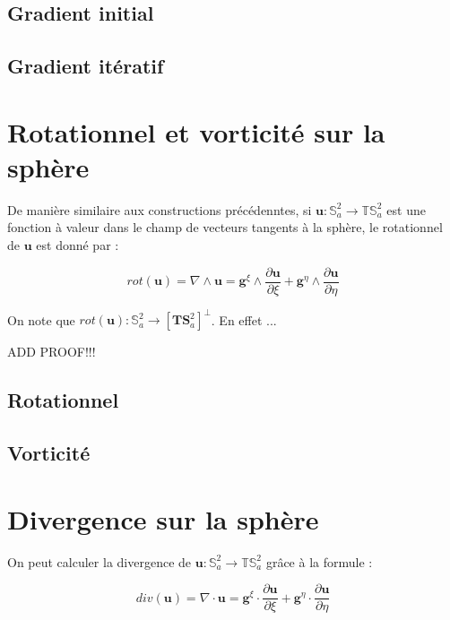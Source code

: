 \subsection{Gradient initial}

\subsection{Gradient itératif}

\section{Rotationnel et vorticité sur la sphère}

De manière similaire aux constructions précédenntes, si $\mathbf{u} : \mathbb{S}^2_a \rightarrow \mathbb{T} \mathbb{S}^2_a$ est une fonction à valeur dans le champ de vecteurs tangents à la sphère, le rotationnel de $\mathbf{u}$ est donné par :

\begin{equation}
rot( \mathbf{u} ) = \nabla \wedge \mathbf{u} = \mathbf{g}^{\xi} \wedge \dfrac{\partial \mathbf{u}}{\partial \xi} + \mathbf{g}^{\eta} \wedge \dfrac{\partial \mathbf{u}}{\partial \eta}
\label{eq:rotationnel}
\end{equation}

On note que $rot( \mathbf{u} ) : \mathbb{S}^2_a \rightarrow \left[ \mathbf{T} \mathbf{S}^2_a \right]^{\bot}$. En effet ... 

ADD PROOF!!!

\subsection{Rotationnel}


\subsection{Vorticité}


\section{Divergence sur la sphère}

On peut calculer la divergence de $\mathbf{u} : \mathbb{S}^2_a \rightarrow \mathbb{T} \mathbb{S}^2_a$ grâce à la formule :

\begin{equation}
div( \mathbf{u} ) = \nabla \cdot \mathbf{u} = \mathbf{g}^{\xi} \cdot \dfrac{\partial \mathbf{u}}{\partial \xi} + \mathbf{g}^{\eta} \cdot \dfrac{\partial \mathbf{u}}{\partial \eta}
\label{eq:divergence_old}
\end{equation}

